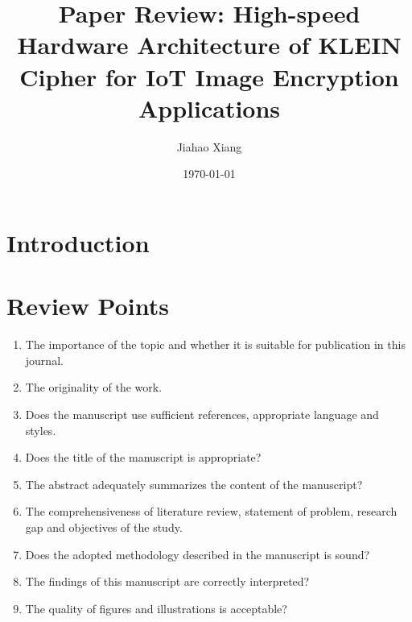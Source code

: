 \documentclass{article}
\title{Paper Review: High-speed Hardware Architecture of KLEIN Cipher for IoT Image Encryption Applications}
\author{Jiahao Xiang}
\date{\today}
\begin{document}
\maketitle

\section{Introduction}




\section{Review Points}
\begin{enumerate}
\item The importance of the topic and whether it is suitable for publication in this journal.
\item The originality of the work.
\item Does the manuscript use sufficient references, appropriate language and styles.
\item Does the title of the manuscript is appropriate?
\item The abstract adequately summarizes the content of the manuscript?
\item The comprehensiveness of literature review, statement of problem, research gap and objectives of the study.
\item Does the adopted methodology described in the manuscript is sound?
\item The findings of this manuscript are correctly interpreted?
\item The quality of figures and illustrations is acceptable?
\end{enumerate} 
\end{document}
